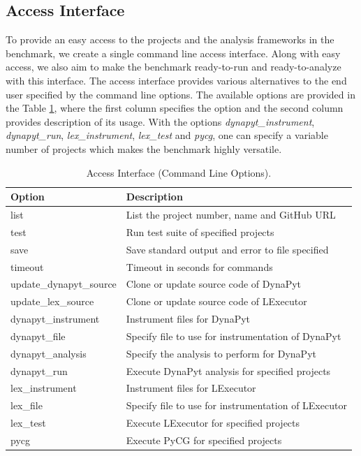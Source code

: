\subsection{Access Interface}
\label{approach:access interface}
To provide an easy access to the projects and the analysis frameworks in the benchmark, we create a single command line access interface.
Along with easy access, we also aim to make the benchmark ready-to-run and ready-to-analyze with this interface. 
The access interface provides various alternatives to the end user specified by the command line options.
The available options are provided in the Table \ref{table:access interface options}, where the first column specifies the option and the second column provides description of its usage.
With the options \textit{dynapyt\_instrument}, \textit{dynapyt\_run}, \textit{lex\_instrument}, \textit{lex\_test} and \textit{pycg}, one can specify a variable number of projects which makes the benchmark highly versatile.

\begin{table}[ht]
    \centering
    \begin{tabular}{ll}
    \hline
    \textbf{Option} & \textbf{Description}\\
    \hline
    list    & List the project number, name and GitHub URL\\
    test    & Run test suite of specified projects\\
    save    & Save standard output and error to file specified\\
    timeout & Timeout in seconds for commands\\
    update\_dynapyt\_source   & Clone or update source code of DynaPyt\\
    update\_lex\_source   & Clone or update source code of LExecutor\\
    dynapyt\_instrument  & Instrument files for DynaPyt\\
    dynapyt\_file    & Specify file to use for instrumentation of DynaPyt\\
    dynapyt\_analysis    & Specify the analysis to perform for DynaPyt\\
    dynapyt\_run & Execute DynaPyt analysis for specified projects\\
    lex\_instrument  & Instrument files for LExecutor\\
    lex\_file    & Specify file to use for instrumentation of LExecutor\\
    lex\_test    & Execute LExecutor for specified projects\\
    pycg    & Execute PyCG for specified projects\\
    \hline
    \end{tabular}
    \caption{Access Interface (Command Line Options).}
    \label{table:access interface options}
\end{table}

